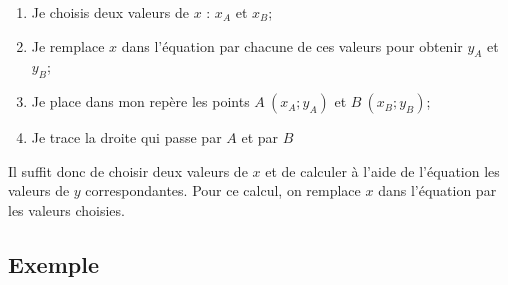\documentclass[12pt,a4paper]{article}
\begin{document}
\begin{enumerate}
	\item Je choisis deux valeurs de $x$ : $x_A$ et $x_B$;
	\item Je remplace $x$ dans l'équation par chacune de ces valeurs pour obtenir $y_A$ et $y_B$;
	\item Je place dans mon repère les points $A\: (x_A; y_A)$ et $B \: (x_B; y_B)$;
	\item Je trace la droite qui passe par $A$ et par $B$
	
\end{enumerate}
Il suffit donc de choisir deux valeurs de $x$ et de calculer à l'aide de l'équation les valeurs de $y$ correspondantes. Pour ce calcul, on remplace $x$ dans l'équation par les valeurs choisies.

\newpage

\subsection{Exemple}
\end{document}

